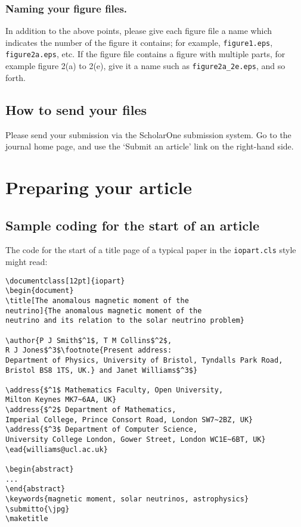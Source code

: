 \documentclass[12pt]{iopart}
\begin{document}
\subsubsection{\label{fname}Naming your figure files.} In addition to the above points, please give each figure file a name which indicates the number of the figure it contains; for example, \verb"figure1.eps", \verb"figure2a.eps", etc. If the figure file contains a figure with multiple parts, for example figure 2(a) to 2(e), give it a name such as \verb"figure2a_2e.eps", and so forth.
\subsection{How to send your files}
Please send your submission via the ScholarOne submission system.  Go to the journal home
page, and use the `Submit an article' link on the right-hand side.

\section{Preparing your article}

\subsection{Sample coding for the start of an article}
\label{startsample}
The code for the start of a title page of a typical paper in the \verb"iopart.cls" style might read:
\small\begin{verbatim}
\documentclass[12pt]{iopart}
\begin{document}
\title[The anomalous magnetic moment of the 
neutrino]{The anomalous magnetic moment of the 
neutrino and its relation to the solar neutrino problem}

\author{P J Smith$^1$, T M Collins$^2$, 
R J Jones$^3$\footnote{Present address:
Department of Physics, University of Bristol, Tyndalls Park Road, 
Bristol BS8 1TS, UK.} and Janet Williams$^3$}

\address{$^1$ Mathematics Faculty, Open University, 
Milton Keynes MK7~6AA, UK}
\address{$^2$ Department of Mathematics, 
Imperial College, Prince Consort Road, London SW7~2BZ, UK}
\address{$^3$ Department of Computer Science, 
University College London, Gower Street, London WC1E~6BT, UK}
\ead{williams@ucl.ac.uk}

\begin{abstract}
...
\end{abstract}
\keywords{magnetic moment, solar neutrinos, astrophysics}
\submitto{\jpg}
\maketitle
\end{verbatim}
\normalsize
\end{document}
